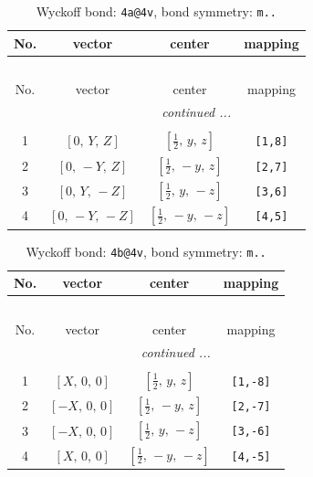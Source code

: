\documentclass[fleqn,8pt]{jsarticle}
\begin{document}
\begin{longtable}{cccc}
\caption{Wyckoff bond: {\tt 4a@4v}, bond symmetry: {\tt m..}}
 \\
 \hline \hline
No. & vector & center & mapping \\ \hline \endfirsthead

\multicolumn{3}{l}{\tablename\ \thetable{}} \\
 \hline \hline
No. & vector & center & mapping \\ \hline \endhead

 \hline \hline
\multicolumn{3}{r}{\footnotesize\it continued ...} \\ \endfoot

 \hline \hline
\multicolumn{3}{r}{} \\ \endlastfoot

1 & $\left[ 0,\, Y,\, Z \right]$ & $\left[ \frac{1}{2},\, y,\, z \right]$ & {\tt [1,8]} \\ \hline
2 & $\left[ 0,\, - Y,\, Z \right]$ & $\left[ \frac{1}{2},\, - y,\, z \right]$ & {\tt [2,7]} \\ \hline
3 & $\left[ 0,\, Y,\, - Z \right]$ & $\left[ \frac{1}{2},\, y,\, - z \right]$ & {\tt [3,6]} \\ \hline
4 & $\left[ 0,\, - Y,\, - Z \right]$ & $\left[ \frac{1}{2},\, - y,\, - z \right]$ & {\tt [4,5]} \\
\end{longtable}
\renewcommand{\arraystretch}{1.2}
\begin{longtable}{cccc}
\caption{Wyckoff bond: {\tt 4b@4v}, bond symmetry: {\tt m..}}
 \\
 \hline \hline
No. & vector & center & mapping \\ \hline \endfirsthead

\multicolumn{3}{l}{\tablename\ \thetable{}} \\
 \hline \hline
No. & vector & center & mapping \\ \hline \endhead

 \hline \hline
\multicolumn{3}{r}{\footnotesize\it continued ...} \\ \endfoot

 \hline \hline
\multicolumn{3}{r}{} \\ \endlastfoot

1 & $\left[ X,\, 0,\, 0 \right]$ & $\left[ \frac{1}{2},\, y,\, z \right]$ & {\tt [1,-8]} \\ \hline
2 & $\left[ - X,\, 0,\, 0 \right]$ & $\left[ \frac{1}{2},\, - y,\, z \right]$ & {\tt [2,-7]} \\ \hline
3 & $\left[ - X,\, 0,\, 0 \right]$ & $\left[ \frac{1}{2},\, y,\, - z \right]$ & {\tt [3,-6]} \\ \hline
4 & $\left[ X,\, 0,\, 0 \right]$ & $\left[ \frac{1}{2},\, - y,\, - z \right]$ & {\tt [4,-5]} \\
\end{longtable}
\end{document}
